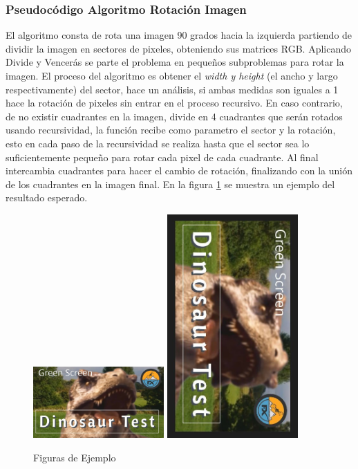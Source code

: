     \subsubsection{Pseudocódigo Algoritmo Rotación Imagen}
    El algoritmo consta de rota una imagen 90 grados hacia la izquierda partiendo de dividir la imagen en sectores de pixeles, obteniendo sus matrices RGB. Aplicando Divide y Vencerás se parte el problema en pequeños subproblemas para rotar la imagen. El proceso del algoritmo es obtener el \textit{width y height} (el ancho y largo respectivamente) del sector, hace un análisis, si ambas medidas son iguales a 1 hace la rotación de pixeles sin entrar en el proceso recursivo. En caso contrario, de no existir cuadrantes en la imagen, divide en  4 cuadrantes que serán rotados usando recursividad, la función recibe como parametro el sector y la rotación, esto en cada paso de la recursividad se realiza hasta que el sector sea lo suficientemente pequeño para rotar cada pixel de cada cuadrante. Al final intercambia cuadrantes para hacer el cambio de rotación, finalizando con la unión de los cuadrantes en la imagen final. En la figura \ref{fig:ejemplo} se muestra un ejemplo del resultado esperado.

    \begin{figure}[!h]
        \centering
        \includegraphics[width=5cm]{Images/Dino-test/dino-test.jpg}\hfill
        \includegraphics[width=5cm]{Images/Dino-test/dino-testrotate.jpg}\hfill
        \caption{Figuras de Ejemplo}
        \label{fig:ejemplo}
    \end{figure}

